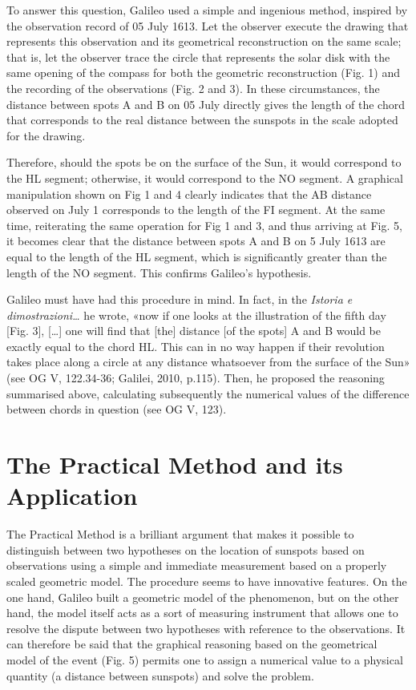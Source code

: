 \begin{artengenv}
To answer this question, Galileo used a simple and ingenious method, inspired by the observation record of 05 July 1613.
Let the observer execute the drawing that represents this observation and its geometrical reconstruction on the same
scale; that is, let the observer trace the circle that represents the solar disk with the same opening of the compass
for both the geometric reconstruction (Fig. 1) and the recording of the observations (Fig. 2 and 3). In these
circumstances, the distance between spots A and B on 05 July directly gives the length of the chord that corresponds to
the real distance between the sunspots in the scale adopted for the drawing. 

Therefore, should the spots be on the surface of the Sun, it would correspond to the HL segment; otherwise, it would
correspond to the NO segment. A graphical manipulation shown on Fig 1 and 4 clearly indicates that the AB distance
observed on July 1 corresponds to the length of the FI segment. At the same time, reiterating the same operation for
Fig 1 and 3, and thus arriving at Fig. 5, it becomes clear that the distance between spots A and B on 5 July 1613 are
equal to the length of the HL segment, which is significantly greater than the length of the NO segment. This confirms
Galileo’s hypothesis.

Galileo must have had this procedure in mind. In fact, in the \textit{Istoria e dimostrazioni…} he wrote, «now if one
looks at the illustration of the fifth day [Fig. 3], […] one will find that [the] distance [of the spots] A and B would
be exactly equal to the chord HL. This can in no way happen if their revolution takes place along a circle at any
distance whatsoever from the surface of the Sun» \label{ref:RNDq17wmDuX91}(see OG V, 122.34-36; Galilei, 2010, p.115).
Then, he proposed the reasoning summarised above, calculating subsequently the numerical values of the difference
between chords in question (see OG V, 123).

\section{The Practical Method and its Application}

The Practical Method is a brilliant argument that makes it possible to distinguish between two hypotheses on the
location of sunspots based on observations using a simple and immediate measurement based on a properly scaled
geometric model. The procedure seems to have innovative features. On the one hand, Galileo built a geometric model of
the phenomenon, but on the other hand, the model itself acts as a sort of measuring instrument that allows one to
resolve the dispute between two hypotheses with reference to the observations. It can therefore be said that the
graphical reasoning based on the geometrical model of the event (Fig. 5) permits one to assign a numerical value to a
physical quantity (a distance between sunspots) and solve the problem.


\end{artengenv}
